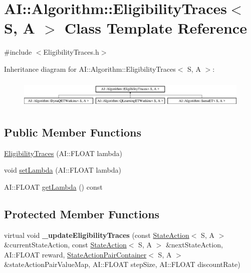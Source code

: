 \hypertarget{classAI_1_1Algorithm_1_1EligibilityTraces}{\section{A\-I\-:\-:Algorithm\-:\-:Eligibility\-Traces$<$ S, A $>$ Class Template Reference}
\label{classAI_1_1Algorithm_1_1EligibilityTraces}
}


{\ttfamily \#include $<$Eligibility\-Traces.\-h$>$}

Inheritance diagram for A\-I\-:\-:Algorithm\-:\-:Eligibility\-Traces$<$ S, A $>$\-:\begin{figure}[H]
\begin{center}
\leavevmode
\includegraphics[height=1.408805cm]{classAI_1_1Algorithm_1_1EligibilityTraces}
\end{center}
\end{figure}
\subsection*{Public Member Functions}
\begin{DoxyCompactItemize}
\item 
\hyperlink{classAI_1_1Algorithm_1_1EligibilityTraces_a5ee88e5ac3059733c38a95dba54f677d}{Eligibility\-Traces} (A\-I\-::\-F\-L\-O\-A\-T lambda)
\item 
void \hyperlink{classAI_1_1Algorithm_1_1EligibilityTraces_ac52edaa0eeaf4446edb14f7b5415819f}{set\-Lambda} (A\-I\-::\-F\-L\-O\-A\-T lambda)
\item 
A\-I\-::\-F\-L\-O\-A\-T \hyperlink{classAI_1_1Algorithm_1_1EligibilityTraces_aea9a2c36874a3df328efdf4077ea1c19}{get\-Lambda} () const 
\end{DoxyCompactItemize}
\subsection*{Protected Member Functions}
\begin{DoxyCompactItemize}
\item 
\hypertarget{classAI_1_1Algorithm_1_1EligibilityTraces_a354115a368dc58abcdbc9285ec2537df}{virtual void {\bfseries \-\_\-update\-Eligibility\-Traces} (const \hyperlink{classAI_1_1StateAction}{State\-Action}$<$ S, A $>$ \&current\-State\-Action, const \hyperlink{classAI_1_1StateAction}{State\-Action}$<$ S, A $>$ \&next\-State\-Action, A\-I\-::\-F\-L\-O\-A\-T reward, \hyperlink{classAI_1_1StateActionPairContainer}{State\-Action\-Pair\-Container}$<$ S, A $>$ \&state\-Action\-Pair\-Value\-Map, A\-I\-::\-F\-L\-O\-A\-T step\-Size, A\-I\-::\-F\-L\-O\-A\-T discount\-Rate)}\label{classAI_1_1Algorithm_1_1EligibilityTraces_a354115a368dc58abcdbc9285ec2537df}

\end{DoxyCompactItemize}
